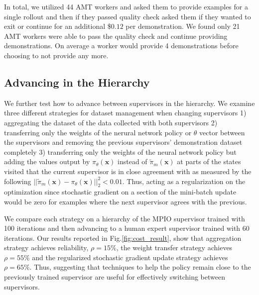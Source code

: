 \documentclass[10pt, conference]{ieeeconf}      %
\newcommand{\bx}{\mathbf{x}}
\begin{document}
In total, we utilized 44 AMT workers and asked them to provide examples for a single rollout and then if they passed
quality check asked them if they wanted to exit or continue for an additional \$$0.12$ per demonstration. We found only
21 AMT workers were able to pass the quality check and continue providing demonstrations. On average a worker would
provide 4 demonstrations before choosing to not provide any more. 

\subsection{Advancing in the Hierarchy}
We further test how to advance between supervisors in the hierarchy. We examine three different strategies for dataset
management when changing supervisors 1) aggregating the dataset of the data collected with both supervisors 2)
transferring only the weights of the nerural network policy or $\theta$ vector between the supervisors and removing the
previous supervisors' demonstration dataset completely 3) transferring only the weights of the neural network policy but
adding the values output by $\pi_\theta(\bx)$  instead of $\tilde{\pi}_m(\bx)$ at parts of the states visited that the
current supervisor is in close agreement with as measured by the following $||\tilde{\pi}_m(\bx) - \pi_\theta(\bx)||^2_2
< 0.01$. Thus, acting as a regularization on the optimization since stochastic gradient on a section of the mini-batch update would be zero for examples where the next supervisor agrees with the previous. 

We compare each strategy on a hierarchy of the MPIO supervisor trained with 100 iterations and then advancing to a human expert supervisor trained with 60 iterations.  Our results reported in Fig.\ref{fig:cost_result}, show that aggregation strategy achieves reliability, $\rho=15\%$, the weight transfer strategy achieves $\rho=55\%$ and the regularized stochastic gradient update strategy achieves $\rho=65\%$. Thus, suggesting that techniques to help the policy remain close to the previously trained supervisor are useful for effectively switching between supervisors.   
 

\end{document}

